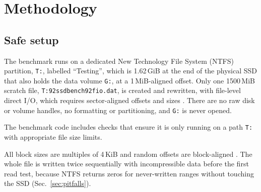 \documentclass{article}
\begin{document}
\section{Methodology}\label{sec:method}
\subsection{Safe setup}\label{sec:safety}
The benchmark runs on a dedicated New Technology File System (NTFS) partition, \texttt{T:}, labelled ``Testing'', which is 1.62\,GiB at the end of the physical SSD that also holds the data volume \texttt{G:}, at a 1\,MiB-aligned offset. Only one 1500\,MiB scratch file, \texttt{T:\char92ssdbench\char92fio.dat}, is created and rewritten, with file-level direct I/O, which requires sector-aligned offsets and sizes \cite{msfilebuf}. There are no raw disk or volume handles, no formatting or partitioning, and \texttt{G:} is never opened.

The benchmark code includes checks that ensure it is only running on a path \texttt{T:} with appropriate file size limits.

All block sizes are multiples of 4\,KiB and random offsets are block-aligned \cite{fiodoc}. The whole file is written twice sequentially with incompressible data before the first read test, because NTFS returns zeros for never-written ranges without touching the SSD (Sec.~\ref{sec:pitfalls}).
\end{document}
